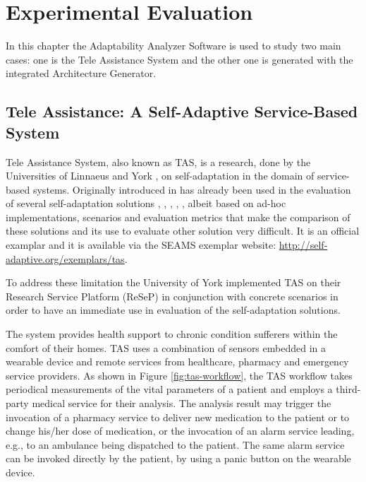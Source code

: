 \chapter{Experimental Evaluation}
\label{cap:evaluation}

In this chapter the Adaptability Analyzer Software is used to study two main cases: one is the Tele Assistance System\cite{teleassist} and the other one is generated with the integrated Architecture Generator.

\section{Tele Assistance: A Self-Adaptive Service-Based System}
Tele Assistance System, also known as TAS, is a research, done by the Universities of Linnaeus and York  \cite{teleassist}, on self-adaptation in the domain of service-based systems. Originally introduced in \cite{valid-web-serv} has already been used in the evaluation of several self-adaptation solutions \cite{valid-web-serv}, \cite{sas-quant-ver}, \cite{dyn-qos-manage}, \cite{mod-evo-conf}, \cite{conq-compl}, albeit based on ad-hoc implementations, scenarios and evaluation metrics that make the comparison of these solutions and its use to evaluate other solution very difficult. It is an official examplar and it is available via the SEAMS exemplar website: \url{http://self-adaptive.org/exemplars/tas}.

To address these limitation the University of York implemented TAS on their Research Service Platform (ReSeP) in conjunction with concrete scenarios in order to have an immediate use in evaluation of the self-adaptation solutions.

The system provides health support to chronic condition sufferers within the comfort of their homes. TAS uses a combination of sensors embedded in a wearable device and remote services from healthcare, pharmacy and emergency service providers. As shown in Figure \ref{fig:tas-workflow}, the TAS workflow takes periodical measurements of the vital parameters of a patient and employs a third-party medical service for their analysis. The analysis result may trigger the invocation of a pharmacy service to deliver new medication to the patient or to change his/her dose of medication, or the invocation of an alarm service leading, e.g., to an ambulance being dispatched to the patient. The same alarm service can be invoked directly by the patient, by using a panic button on the wearable device.

